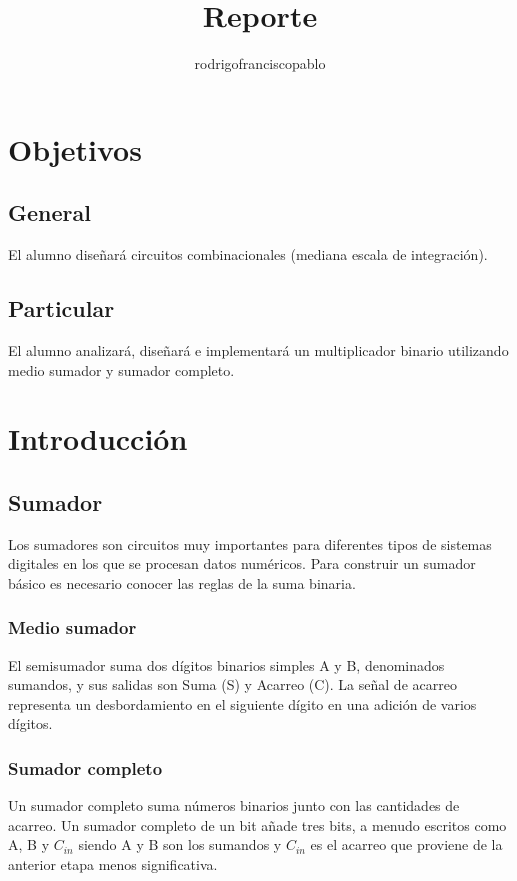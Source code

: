 \documentclass{mylib/reporteConCalif}
\title{Reporte}
\author{rodrigofranciscopablo }
\begin{document}
\coverPage

\section{Objetivos}

\subsection{General}

El alumno diseñará circuitos combinacionales (mediana escala de integración).

\subsection{Particular}

El alumno analizará, diseñará e implementará un multiplicador binario utilizando medio sumador y
sumador completo.

\section{Introducción}

\subsection{Sumador}
Los sumadores son circuitos muy importantes para diferentes tipos de sistemas digitales en los que se procesan datos numéricos. Para construir un sumador básico es necesario conocer las reglas de la suma binaria.

\subsubsection{Medio sumador}

El semisumador suma dos dígitos binarios simples A y B, denominados sumandos, y sus salidas son Suma (S) y Acarreo (C). La señal de acarreo representa un desbordamiento en el siguiente dígito en una adición de varios dígitos.

\subsubsection{Sumador completo}
Un sumador completo suma números binarios junto con las cantidades de acarreo. Un sumador completo de un bit añade tres bits, a menudo escritos como A, B y $C_{in}$ siendo A y B son los sumandos y $C_{in}$ es el acarreo que proviene de la anterior etapa menos significativa.
\end{document}
